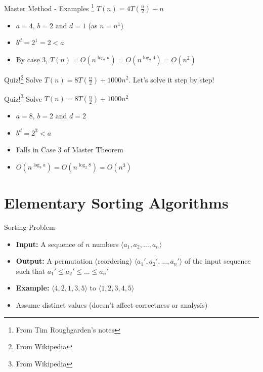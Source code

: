 \documentclass{beamer}
\begin{document}
\begin{frame}{Master Method - Examples \footnote{From Tim Roughgarden's notes}}
$T(n) = 4T(\frac{n}{2}) + n$
\begin{itemize}
\item $a=4$, $b=2$ and $d=1$ (as $n = n^1$)
\item $b^d = 2^1 = 2 < a$ 
\item By case 3, $T(n) = O(n^{\log_b a}) = O(n^{\log_2 4}) = O(n^2)$
\end{itemize}
\end{frame}



\begin{frame}{Quiz!\footnote{From Wikipedia}}
Solve $T(n) = 8T(\frac{n}{2}) + 1000n^2$. Let's solve it step by step!
\end{frame}

\begin{frame}{Quiz!\footnote{From Wikipedia}}
Solve $T(n) = 8T(\frac{n}{2}) + 1000n^2$
\begin{itemize}
\item $a=8$, $b=2$ and $d=2$
\item $b^d = 2^2 < a$
\item Falls in Case 3 of Master Theorem
\item $O(n^{\log_b a}) = O(n^{\log_2 8}) = O(n^3)$
\end{itemize}
\end{frame}


\section{Elementary Sorting Algorithms}
\begin{frame}{Sorting Problem}
\begin{itemize}
\item {\bf Input:} A sequence of $n$ numbers $\langle a_1, a_2, \ldots, a_n \rangle$
\item {\bf Output:} A permutation (reordering) $\langle a_1', a_2', \ldots,  a_n' \rangle$ of the input sequence 
such that $a_1' \leq a_2' \leq \ldots \leq a_n'$
\item {\bf Example:} $\langle 4, 2, 1, 3, 5\rangle$ to $\langle 1, 2, 3, 4, 5\rangle$
\item Assume distinct values (doesn't affect correctness or analysis)
\end{itemize}
\end{frame}
\end{document}
